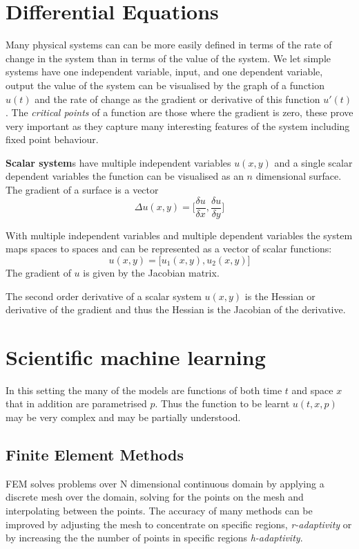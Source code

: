   \section{Differential Equations}
Many physical systems can  can be more easily defined in terms of the rate of change in the system than in terms of the value of the system. We let simple systems have one independent variable, input, and one dependent variable, output the value of the system can be visualised by the graph of a function $u(t)$ and the rate of change as the gradient or derivative of this function $u'(t)$.  The \emph{critical points} of a function are those where the gradient is zero, these prove very important as they capture many interesting features of the system including fixed point behaviour.
  
  {\bf Scalar system}s have  multiple independent variables $u(x,y)$ and a single scalar dependent variables the function can be visualised as an $n$ dimensional  surface. The gradient of a surface is a vector
\[\Delta u(x,y)  = \big[\frac{\delta u}{\delta x},\frac{\delta u}{\delta y}\big] \]

With multiple independent variables and multiple dependent variables the system maps spaces to spaces and can be represented as  a vector of scalar functions:
\[ u(x,y) = \big[ u_1(x,y), u_2(x,y)\big] \]
The gradient of $u$ is given by the Jacobian matrix.


The second order derivative of a scalar system $u(x,y)$  is the Hessian or derivative of the gradient and thus 
the Hessian is the Jacobian of the derivative.



  
  
\section{Scientific machine learning}
In this setting the many of the models are functions of both time $t$ and space $x$ that in addition are parametrised $p$. Thus the function to be learnt $u(t,x,p)$  may be very  complex and may be partially understood.


\subsection{Finite Element Methods}
FEM solves problems over N dimensional continuous domain by applying a discrete mesh over the  domain, solving for the points on the mesh and interpolating between the points. The accuracy of many methods can be improved by adjusting the mesh to concentrate on specific regions, \emph{r-adaptivity} or by increasing the the number of points in specific regions \emph{h-adaptivity}.


